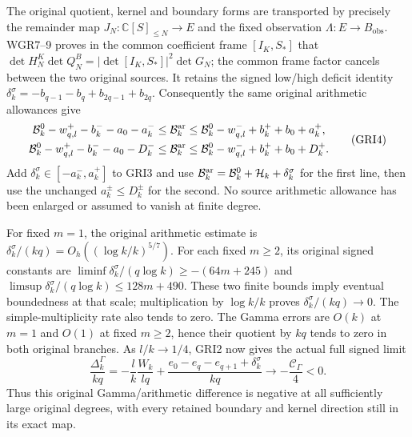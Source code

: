 \documentclass[11pt,a4paper]{article}
\begin{document}
The original quotient, kernel and boundary forms are transported
by precisely the remainder map $J_N:\mathbb C[S]_{\leq N}\to E$
and the fixed observation $\Lambda:E\to B_{\mathrm{obs}}$.
WGR7--9 proves in the common coefficient frame $[I_K,S_*]$ that
$\det H_N^K\det Q_N^B=|\det[I_K,S_*]|^2\det G_N$;
the common frame factor cancels between the two original sources.
It retains the signed low/high deficit identity
$\delta_k^\sigma=-b_{q-1}-b_q+b_{2q-1}+b_{2q}$.
Consequently the same original arithmetic allowances give
\[
\begin{gathered}
 \mathcal B_k^0-w^+_{q,l}-b_k^--a_0-a_k^-
 \leq\mathcal B_k^{\rm ar}
 \leq\mathcal B_k^0-w^-_{q,l}+b_k^++b_0+a_k^+,\\
 \mathcal B_k^0-w^+_{q,l}-b_k^--a_0-D_k^-
 \leq\mathcal B_k^{\rm ar}
 \leq\mathcal B_k^0-w^-_{q,l}+b_k^++b_0+D_k^+.
\end{gathered}\tag{GRI4}
\]
Add $\delta_k^\sigma\in[-a_k^-,a_k^+]$ to GRI3 and use
$\mathcal B_k^{\rm ar}=\mathcal B_k^0+\mathcal H_k+\delta_k^\sigma$
for the first line, then use the unchanged $a_k^\pm\leq D_k^\pm$
for the second. No source arithmetic allowance has been enlarged
or assumed to vanish at finite degree.

For fixed $m=1$, the original arithmetic estimate is
$\delta_k^\sigma/(kq)=O_h((\log k/k)^{5/7})$.
For each fixed $m\geq2$, its original signed constants are
$\liminf\delta_k^\sigma/(q\log k)\geq-(64m+245)$ and
$\limsup\delta_k^\sigma/(q\log k)\leq128m+490$.
These two finite bounds imply eventual boundedness at that
scale; multiplication by $\log k/k$ proves
$\delta_k^\sigma/(kq)\to0$. The simple-multiplicity rate
also tends to zero. The Gamma errors are $O(k)$ at $m=1$
and $O(1)$ at fixed $m\geq2$, hence their quotient by $kq$
tends to zero in both original branches. As $l/k\to1/4$,
GRI2 now gives the actual full signed limit
\[
 \frac{\Delta_k^\Gamma}{kq}
 =-\frac{l}{k}\frac{W_k}{lq}
       +\frac{e_0-e_q-e_{q+1}+\delta_k^\sigma}{kq}
 \longrightarrow-\frac{\mathcal C_\Gamma}{4}<0.
 \tag{GRI5}
\]
Thus this original Gamma/arithmetic difference is negative
at all sufficiently large original degrees, with every
retained boundary and kernel direction still in its exact map.
\end{document}

